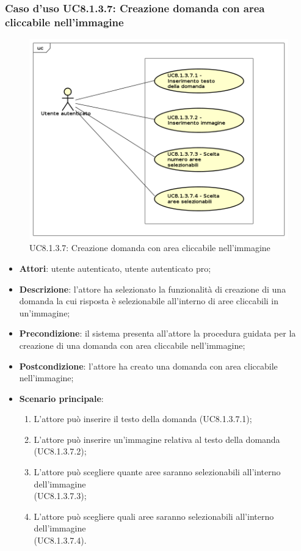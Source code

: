 \subsubsection{Caso d'uso UC8.1.3.7: Creazione domanda con area cliccabile nell'immagine}
\label{UC8.1.3.7}
\begin{figure}[h]
	\centering
	\includegraphics[scale=0.5,keepaspectratio]{UML/UC8_1_3_7.png}
	\caption{UC8.1.3.7: Creazione domanda con area cliccabile nell'immagine}
\end{figure}
\FloatBarrier
\begin{itemize}
	\item \textbf{Attori}: utente autenticato, utente autenticato pro;
	\item \textbf{Descrizione}: l'attore ha selezionato la funzionalità di creazione di una domanda la cui risposta è selezionabile all'interno di aree cliccabili in un'immagine;
	\item \textbf{Precondizione}: il sistema presenta all'attore la procedura guidata per la creazione di una domanda con area cliccabile nell'immagine;
	\item \textbf{Postcondizione}: l'attore ha creato una domanda con area cliccabile nell'immagine;
	\item \textbf{Scenario principale}:
		\begin{enumerate}
	       	\item L'attore può inserire il testo della domanda (UC8.1.3.7.1);
	        \item L'attore può inserire un'immagine relativa al testo della domanda (UC8.1.3.7.2);
		\item L'attore può scegliere quante aree saranno selezionabili all'interno dell'immagine \\(UC8.1.3.7.3);
		\item L'attore può scegliere quali aree saranno selezionabili all'interno dell'immagine \\(UC8.1.3.7.4).
	 	\end{enumerate}
\end{itemize}

